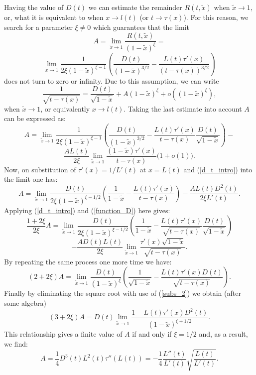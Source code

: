 Having the value of  $D(t)$ we can estimate the remainder $R(t,\tilde x)$
when $\tilde x\to1$, or, what it is equivalent to when $x\to l(t)$ (or $t\to \tau(x)$).
For this reason, we search for a parameter $\xi\ne0$ which guarantees that the limit
\[
A=\lim_{\tilde{x}\rightarrow1}\frac{R(t,\tilde{x})}{(1-\tilde{x})^{\xi}}=
\]
\[
\lim_{\tilde{x}\rightarrow1}
\frac{1}{2\xi(1-\tilde{x})^{\xi-1}}
\left(\frac{D(t)}{(1-\tilde{x})^{3/2}}-\frac{L(t)\tau'(x)}{(t-\tau(x))^{3/2}}
\right)
\]
does not turn to zero or infinity. Due to this assumption, we can write
\begin{equation}
\frac{1}{\sqrt{t-\tau(x)}}= \frac{D(t)}{\sqrt{1-\tilde{x}}}+A (1-\tilde{x})^{\xi}+o\left((1-\tilde{x})^{\xi}\right),
\label{subs_2}
\end{equation}
when $\tilde x \rightarrow 1$, or equivalently $x \rightarrow l(t)$.
Taking the last estimate into account $A$ can be expressed as:
\[
A=\lim_{\tilde{x}\rightarrow1}\frac{1}{2\xi(1-\tilde{x})^{\xi-1}}
\left(\frac{D(t)}{(1-\tilde{x})^{3/2}}-\frac{L(t)\tau'(x)}{t-\tau(x)}
\frac{D(t)}{\sqrt{1-\tilde{x}}}
\right)-
\]
\[
\frac{AL(t)}{2\xi}\lim_{\tilde{x}\rightarrow1}\frac{(1-\tilde{x})\tau'(x)}{t-\tau(x)}\big(1+o(1)\big).
\]
Now, on substitution of $\tau'(x)=1/L'(t)$ at $x=L(t)$ and (\ref{d_t_intro}) into the limit one has:
\[
A=\lim_{\tilde{x}\rightarrow1}\frac{D(t)}{2\xi(1-\tilde{x})^{\xi-1/2}}
\left(\frac{1}{1-\tilde{x}}-\frac{L(t)\tau'(x)}{t-\tau(x)}
\right)-\frac{AL(t)D^2(t)}{2\xi L'(t)}.
\]
Applying (\ref{d_t_intro}) and (\ref{function_D}) here gives:
\[
\frac{1+2\xi}{2\xi}A=\lim_{\tilde{x}\rightarrow1}\frac{D(t)}{2\xi(1-\tilde{x})^{\xi-1/2}}
\left(\frac{1}{1-\tilde{x}}-\frac{L(t)\tau'(x)}{\sqrt{t-\tau(x)}}
\frac{D(t)}{\sqrt{1-\tilde{x}}}
\right)
\]
\[
-
\frac{AD(t)L(t)}{2\xi}\lim_{\tilde{x}\rightarrow1}\frac{\tau'(x)\sqrt{1-\tilde{x}}}{\sqrt{t-\tau(x)}}.
\]
By repeating the same process one more time we have:
\[
(2+2\xi)A=\lim_{\tilde{x}\rightarrow1}\frac{D(t)}{(1-\tilde{x})^{\xi}}
\left(\frac{1}{\sqrt{1-\tilde{x}}}-\frac{L(t)\tau'(x)D(t)}{\sqrt{t-\tau(x)}}
\right).
\]
Finally by eliminating the square root with use of (\ref{subs_2}) we obtain (after some algebra)
\[
(3+2\xi)A=D(t)\lim_{\tilde{x}\rightarrow1}
\frac{1-L(t)\tau'(x)D^2(t)}{(1-\tilde{x})^{\xi+1/2}}.
\]
This relationship gives a finite value of $A$ if and only if $\xi=1/2$ and, as a result, we find:
\[
A=\frac{1}{4}D^3(t)L^2(t)\tau''(L(t))=
-\frac{1}{4}\frac{L''(t)}{L'(t)}\sqrt{\frac{L(t)}{L'(t)}}.
\]